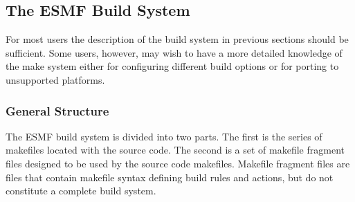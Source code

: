 

\subsection{The ESMF Build System}
\label{sec:make}
For most users the description of the build system in previous
sections should be sufficient.  Some users, however, may wish to have
a more detailed knowledge of the make system either for configuring
different build options or for porting to unsupported platforms.
\subsubsection{General Structure}

The ESMF build system is divided into two parts.  The first is the
series of makefiles located with the source code.  The second is a set
of makefile fragment files designed to be used by the source code
makefiles.  Makefile fragment files are files that contain makefile
syntax defining build rules and actions, but do not constitute a
complete build system.

